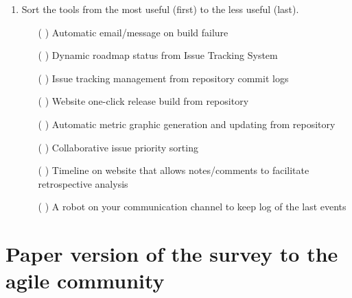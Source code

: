 \documentclass[lnbip]{svmultln}
\begin{document}
\begin{enumerate}
\item Sort the tools from the most useful (first) to the less useful
  (last).
  \begin{itemize}
  \item[( ) ] Automatic email/message on build failure
  \item[( ) ] Dynamic roadmap status from Issue Tracking System
  \item[( ) ] Issue tracking management from repository commit logs
  \item[( ) ] Website one-click release build from repository
  \item[( ) ] Automatic metric graphic generation and updating from
    repository
  \item[( ) ] Collaborative issue priority sorting
  \item[( ) ] Timeline on website that allows notes/comments to
    facilitate retrospective analysis
  \item[( ) ] A robot on your communication channel to keep log of the
    last events
  \end{itemize}
\end{enumerate}

\section{Paper version of the survey to the agile community}
\label{appendix:b}
\end{document}
